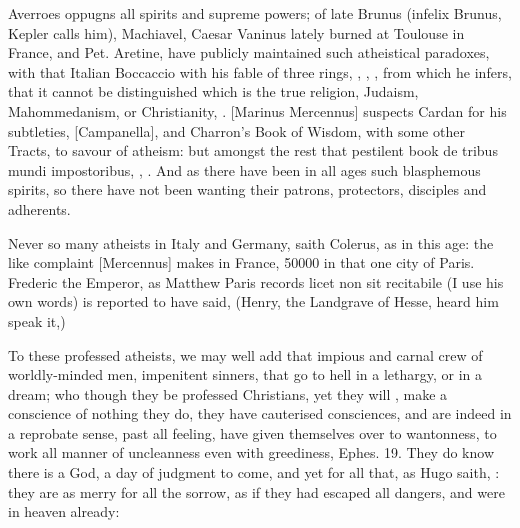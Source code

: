 {Averroes oppugns all spirits and supreme powers; of late Brunus
(infelix Brunus, Kepler calls him), Machiavel, Caesar Vaninus
lately burned at Toulouse in France, and Pet. Aretine, have publicly
maintained such atheistical paradoxes, with that Italian
Boccaccio with his fable of three rings, \etc{}, , \etc{}, from which he infers, that it
cannot be distinguished which is the true religion, Judaism,
Mahommedanism, or Christianity, \etc{}. [Marinus Mercennus] suspects
Cardan for his subtleties, [Campanella], and Charron's Book of Wisdom,
with some other Tracts, to savour of atheism: but amongst the
rest that pestilent book de tribus mundi impostoribus, , \etc{}. And
as there have been in all ages such blasphemous spirits, so there have
not been wanting their patrons, protectors, disciples and adherents.

Never so many atheists in Italy and Germany, saith Colerus, as in
this age: the like complaint [Mercennus] makes in France, 50\thinspace{}000 in that
one city of Paris. Frederic the Emperor, as Matthew Paris records
licet non sit recitabile (I use his own words) is reported to have
said,  (Henry, the
Landgrave of Hesse, heard him speak it,) 

To these professed atheists, we may well add that impious and carnal
crew of worldly-minded men, impenitent sinners, that go to hell in a
lethargy, or in a dream; who though they be professed Christians, yet
they will , make a conscience of nothing they do,
they have cauterised consciences, and are indeed in a reprobate sense,
past all feeling, have given themselves over to wantonness, to work all
manner of uncleanness even with greediness, Ephes.  19. They do know
there is a God, a day of judgment to come, and yet for all that, as
Hugo saith, : they are as
merry for all the sorrow, as if they had escaped all dangers, and were
in heaven already:

}
